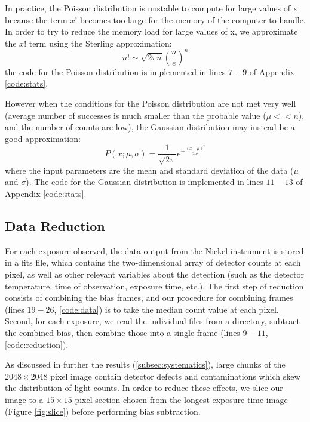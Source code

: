 \documentclass[preprint]{aastex62}
\begin{document}
In practice, the Poisson distribution is unstable to compute for large values of x because the term $x!$ becomes too large for the memory of the computer to handle. In order to try to reduce the memory load for large values of x, we approximate the $x!$ term using the Sterling approximation:
\begin{equation}
n! \sim \sqrt{2\pi n}\left(\frac{n}{e} \right)^n
\end{equation}
the code for the Poisson distribution is implemented in lines $7-9$ of Appendix \ref{code:stats}.

However when the conditions for the Poisson distribution are not met very well (average number of successes is much smaller than the probable value ($\mu << n$), and the number of counts are low), the Gaussian distribution may instead be a good approximation:
\begin{equation}
P(x; \mu, \sigma) = \frac{1}{\sqrt{2\pi}} e^{-\frac{(x-\mu)^2}{2\sigma^2}}
\end{equation}
where the input parameters are the mean and standard deviation of the data ($\mu$ and $\sigma$). The code for the Gaussian distribution is implemented in lines $11-13$ of Appendix \ref{code:stats}. 

\subsection{Data Reduction} \label{sec:reduction}
For each exposure observed, the data output from the Nickel instrument is stored in a fits file, which contains the two-dimensional array of detector counts at each pixel, as well as other relevant variables about the detection (such as the detector temperature, time of observation, exposure time, etc.). The first step of reduction consists of combining the bias frames, and our procedure for combining frames (lines $19-26$, \ref{code:data}) is to take the median count value at each pixel. Second, for each exposure, we read the individual files from a directory, subtract the combined bias, then combine those into a single frame (lines $9-11$, \ref{code:reduction}).

As discussed in further the results (\ref{subsec:systematics}), large chunks of the $2048\times2048$ pixel image contain detector defects and contaminations which skew the distribution of light counts. In order to reduce these effects, we slice our image to a $15\times15$ pixel section chosen from the longest exposure time image (Figure \ref{fig:slice}) before performing bias subtraction.
\end{document}
